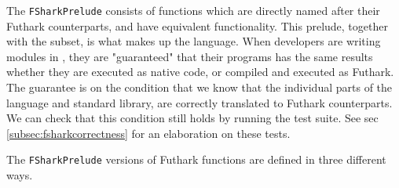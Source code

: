 The \texttt{FSharkPrelude} consists of functions which are directly named after
their Futhark counterparts, and have equivalent functionality.
This prelude, together with the \fshark{} subset, is what makes up the \fshark{} language.
When \fshark{} developers are writing modules in \fshark{}, they are "guaranteed"
that their \fshark{} programs has the same results whether they are executed as
native \fsharp{} code, or compiled and executed as Futhark. 
The guarantee is on the condition that we know that the
individual parts of the \fshark{} language and standard library,  are correctly
translated to Futhark counterparts.
We can check that this condition still holds by running the \fshark{} test
suite. See sec \ref{subsec:fsharkcorrectness} for an elaboration on these tests.


The \texttt{FSharkPrelude} versions of Futhark functions are defined in three
different ways.

